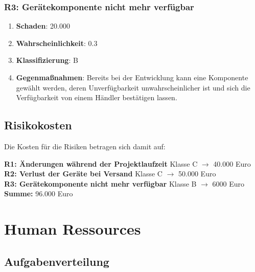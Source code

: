 \subsubsection{R3: Gerätekomponente nicht mehr verfügbar}
\begin{enumerate}
	\item \textbf{Schaden}: 20.000
	\item \textbf{Wahrscheinlichkeit}: 0.3
	\item \textbf{Klassifizierung}: B
	\item \textbf{Gegenmaßnahmen}: Bereits bei der Entwicklung kann eine Komponente gewählt werden, deren Unverfügbarkeit unwahrscheinlicher ist und sich die Verfügbarkeit von einem Händler bestätigen lassen.
\end{enumerate}

\subsection{Risikokosten}

Die Kosten für die Risiken betragen sich damit auf:

\textbf{R1: Änderungen während der Projektlaufzeit} Klasse C  $\rightarrow$ 40.000 Euro\\
\textbf{R2: Verlust der Geräte bei Versand} Klasse C  $\rightarrow$ 50.000 Euro\\
\textbf{R3: Gerätekomponente nicht mehr verfügbar} Klasse B  $\rightarrow$ 6000 Euro\\
\textbf{Summe:} 96.000 Euro

\section{Human Ressources}
\subsection{Aufgabenverteilung}


